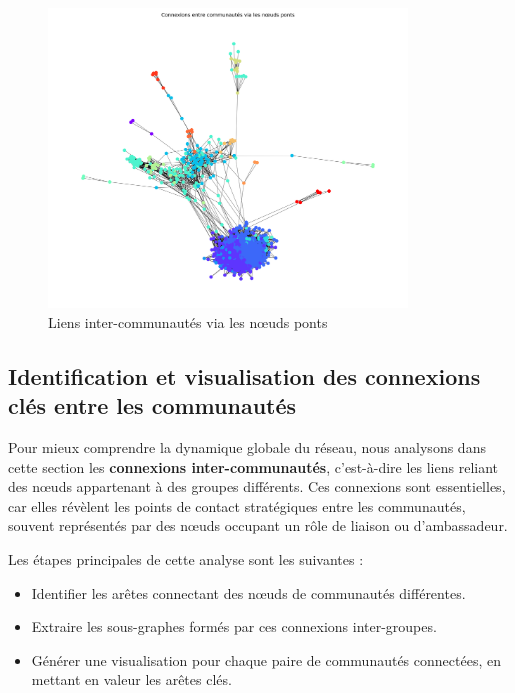 \documentclass[a4paper, 12pt, twoside]{article}
\begin{document}
\begin{figure}[H]
    \centering
    \includegraphics[width=0.85\textwidth]{inter_community_links.png}
    \caption{Liens inter-communautés via les nœuds ponts}
    \label{fig:inter_community_links}
\end{figure}

\newpage
\subsection{Identification et visualisation des connexions clés entre les communautés}

Pour mieux comprendre la dynamique globale du réseau, nous analysons dans cette section les \textbf{connexions inter-communautés}, c’est-à-dire les liens reliant des nœuds appartenant à des groupes différents. Ces connexions sont essentielles, car elles révèlent les points de contact stratégiques entre les communautés, souvent représentés par des nœuds occupant un rôle de liaison ou d'ambassadeur.

\vspace{1em}
Les étapes principales de cette analyse sont les suivantes :
\begin{itemize}
    \item Identifier les arêtes connectant des nœuds de communautés différentes.
    \item Extraire les sous-graphes formés par ces connexions inter-groupes.
    \item Générer une visualisation pour chaque paire de communautés connectées, en mettant en valeur les arêtes clés.
\end{itemize}
\end{document}
